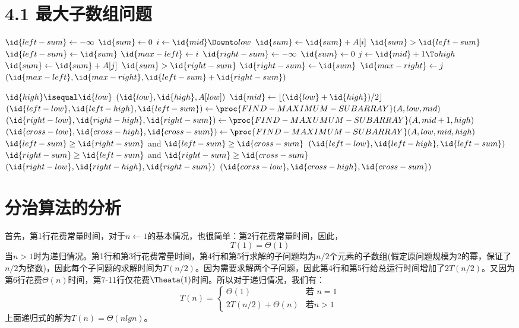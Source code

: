\documentclass[a4paper,11pt]{article}
\newcommand{\floor}[1]{\left\lfloor #1 \right\rfloor}
\begin{document}
\section*{4.1 最大子数组问题}
\begin{codebox}
\li $\id{left-sum} \gets -\infty$
\li $\id{sum} \gets 0$
\li \For $i \gets \id{mid} \Downto low$
\li 	\Do
			$\id{sum} \gets \id{sum} + A[i]$
\li		\If $\id{sum} > \id{left-sum}$
\li				\Then
					$\id{left-sum} \gets \id{sum}$
\li				$\id{max-left} \gets i$					
					\End
			\End
\li	$\id{right-sum} \gets -\infty$
\li $\id{sum} \gets 0$
\li \For $j \gets \id{mid} + 1 \To high$
\li		\Do
			$\id{sum} \gets \id{sum} + A[j]$
\li		\If $\id{sum} > \id{right-sum}$
\li			\Then
					$\id{right-sum} \gets \id{sum}$
\li				$\id{max-right} \gets j$	
				\End
			\End
			\li \Return $(\id{max-left},\id{max-right},\id{left-sum}+\id{right-sum})$
\end{codebox}

\begin{codebox}
	\li	\If $\id{high} \isequal \id{low}$
	\li		\Then 
					\Return $(\id{low},\id{high},A[low])$
	\li		\Else 
					$\id{mid} \gets \floor{(\id{low}+\id{high})/2}$
	\li			$(\id{left-low},\id{left-high},\id{left-sum}) \gets \proc{FIND-MAXIMUM-SUBARRAY}(A,low,mid)$
	\li			$(\id{right-low},\id{right-high},\id{right-sum}) \gets \proc{FIND-MAXUMUM-SUBARRAY}(A,mid+1,high)$
	\li			$(\id{cross-low},\id{cross-high},\id{cross-sum}) \gets \proc{FIND-MAXIMUM-SUBARRAY}(A,low,mid,high)$
	\li			\If $\id{left-sum} \geq \id{right-sum}$ and $\id{left-sum} \geq \id{cross-sum}$
	\li				\Then \Return $(\id{left-low},\id{left-high},\id{left-sum})$
	\li				\ElseIf $\id{right-sum} \geq \id{left-sum}$ and $\id{right-sum} \geq \id{cross-sum}$
	\li				\Then \Return $(\id{right-low},\id{right-high},\id{right-sum})$
	\li				\ElseNoIf \Return $(\id{corss-low},\id{cross-high},\id{cross-sum})$
						\End
				\End
\end{codebox}
\section*{分治算法的分析}
首先，第1行花费常量时间，对于$n \gets 1$的基本情况，也很简单：第2行花费常量时间，因此，
\[
	T(1) = \Theta(1)
\]
当$n>1$时为递归情况。第1行和第3行花费常量时间，第4行和第5行求解的子问题均为$n/2$个元素的子数组(假定原问题规模为2的幂，保证了$n/2$为整数)，因此每个子问题的求解时间为$T(n/2)$。因为需要求解两个子问题，因此第4行和第5行给总运行时间增加了$2T(n/2)$。又因为第6行花费$\Theta(n)$时间，第7-11行仅花费$\Theata(1)$时间。所以对于递归情况，我们有：
\[
	T(n)=
	\begin{cases}
		\Theta(1) & \text{若 $n=1$}\\
		2T(n/2) + \Theta(n) & \text{若$n>1$}
	\end{cases}
\]
上面递归式的解为$T(n)=\Theta(nlgn)$。
\end{document}
